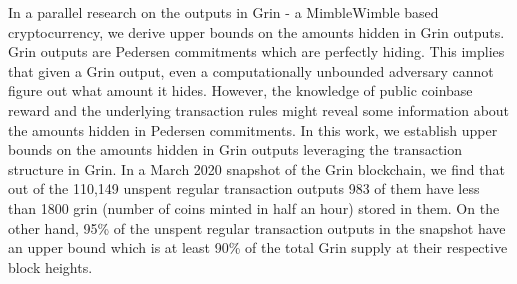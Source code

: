 \begin{Abstract}
In a parallel research on the outputs in Grin - a MimbleWimble based cryptocurrency, we derive upper bounds on the amounts hidden in Grin outputs. 
Grin outputs are Pedersen commitments which are perfectly hiding.
This implies that given a Grin output, even a computationally unbounded adversary cannot figure out what amount it hides. 
However, the knowledge of public coinbase reward and the underlying transaction rules might reveal some information about the amounts hidden in Pedersen commitments.
In this work, we establish upper bounds on the amounts hidden in Grin outputs leveraging the transaction structure in Grin.
In a March 2020 snapshot of the Grin blockchain, we find that out of the 110,149 unspent regular transaction outputs 983 of them have less than 1800 grin (number of coins minted in half an hour) stored in them.
On the other hand, 95\% of the unspent regular transaction outputs in the snapshot have an upper bound which is at least 90\% of the total Grin supply at their respective block heights.

%
%
%
%
%
\end{Abstract}

